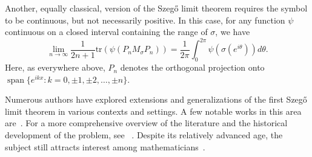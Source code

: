 \documentclass{amsart}
\theoremstyle{definition}
\theoremstyle{remark}
\numberwithin{equation}{section}
\begin{document}
\noindent Another, equally classical, version of the Szeg\H{o} limit theorem requires the symbol to be continuous, but not necessarily positive. In this case, for any function $\psi$ continuous on a closed interval containing the range of $\sigma$, we have 
\begin{equation}\label{Szegocont}
    \lim_{n\to\infty}\frac{1}{2n+1}\text{tr}\left(\psi\left(P_{n}M_{\sigma}P_{n}\right)\right)=\frac{1}{2\pi}\int_{0}^{2\pi}\psi\left(\sigma\left(e^{i\theta}\right)\right)d\theta. 
\end{equation}
Here, as everywhere above, $P_n$ denotes the orthogonal projection onto 
$\operatorname{span} \{ e^{ikx} : k = 0, \pm 1, \pm 2, \dots, \pm n \}$.
 
 
Numerous authors have explored extensions and generalizations of the first Szeg\H{o} limit theorem in various contexts and settings. A few notable works in this area are~\cite{guille79,kryein1983some,laptev1996szego,widom1979eigenvalue,widom2006asymptotic}. For a more comprehensive overview of the literature and the historical development of the problem, see  ~\cite{bottcher2013analysis,guille79,simon2005orthogonal}. Despite its relatively advanced age, the subject still attracts interest among mathematicians~\cite{guo2024first,MO24,nikolski2020szeg}. 
 
\end{document}
